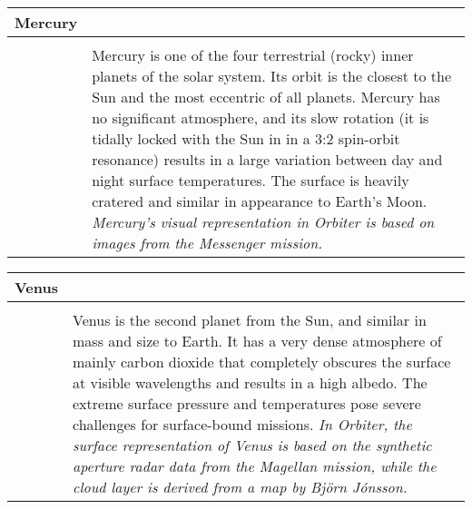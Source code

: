 \documentclass[Orbiter User Manual.tex]{subfiles}
\begin{document}
\begin{table}[H]
	\begin{tabularx}{\textwidth}{ |lX| }
	\hline\rule{0pt}{2ex}
	\textbf{Mercury} &\\
	\hline\rule{0pt}{2ex}
	\adjustbox{valign=t}{
		\begin{tabular}{ c }
		\texttt{[image: solsys\_mercury.jpg]}\\
		\end{tabular}
		}
	& \vfill
	Mercury is one of the four terrestrial (rocky) inner planets of the solar system. Its orbit is the closest to the Sun and the most eccentric of all planets.\newline
		Mercury has no significant atmosphere, and its slow rotation (it is tidally locked with the Sun in in a 3:2 spin-orbit resonance) results in a large variation between day and night surface temperatures. The surface is heavily cratered and similar in appearance to Earth's Moon.\newline
		\newline
		\textit{Mercury's visual representation in Orbiter is based on images from the Messenger mission.}\\
	\hline
	\end{tabularx}
\end{table}


\begin{table}[H]
	\begin{tabularx}{\textwidth}{ |lX| }
	\hline\rule{0pt}{2ex}
	\textbf{Venus} &\\
	\hline\rule{0pt}{2ex}
	\adjustbox{valign=t}{
		\begin{tabular}{ c }
		\texttt{[image: solsys\_venus.jpg]}\\
		\end{tabular}
		}
	& \vfill
	Venus is the second planet from the Sun, and similar in mass and size to Earth. It has a very dense atmosphere of mainly carbon dioxide that completely obscures the surface at visible wavelengths and results in a high albedo. The extreme surface pressure and temperatures pose severe challenges for surface-bound missions.\newline
		\newline
		\textit{In Orbiter, the surface representation of Venus is based on the synthetic aperture radar data from the Magellan mission, while the cloud layer is derived from a map by Björn Jónsson.}\\
	\hline
	\end{tabularx}
\end{table}
\end{document}
